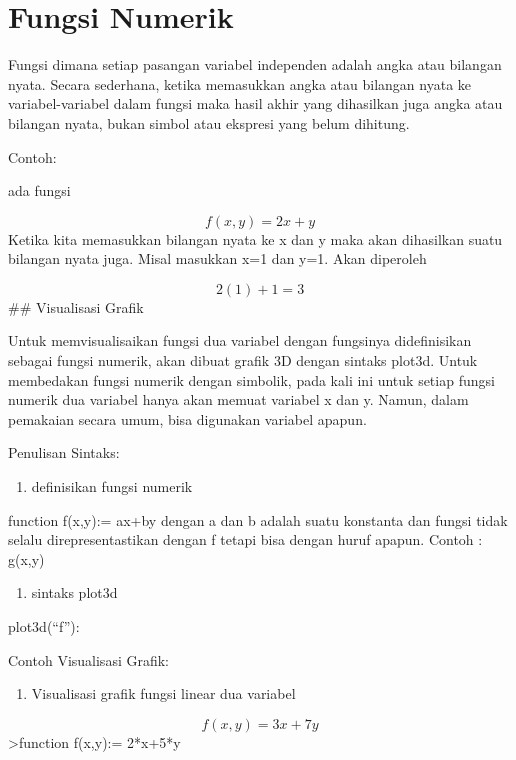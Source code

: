 \documentclass[
]{book}
\providecommand{\tightlist}{%
  \setlength{\itemsep}{0pt}\setlength{\parskip}{0pt}}
\begin{document}
\section{Fungsi Numerik}\label{fungsi-numerik}

Fungsi dimana setiap pasangan variabel independen adalah angka atau bilangan nyata. Secara sederhana, ketika memasukkan angka atau bilangan nyata ke variabel-variabel dalam fungsi maka hasil akhir yang dihasilkan juga angka atau bilangan nyata, bukan simbol atau ekspresi yang belum dihitung.

Contoh:

ada fungsi

\[f(x,y)=2x+y\]Ketika kita memasukkan bilangan nyata ke x dan y maka akan dihasilkan suatu bilangan nyata juga. Misal masukkan x=1 dan y=1. Akan diperoleh

\[2(1)+1=3\]\#\# Visualisasi Grafik

Untuk memvisualisaikan fungsi dua variabel dengan fungsinya didefinisikan sebagai fungsi numerik, akan dibuat grafik 3D dengan sintaks plot3d. Untuk membedakan fungsi numerik dengan simbolik, pada kali ini untuk setiap fungsi numerik dua variabel hanya akan memuat variabel x dan y. Namun, dalam pemakaian secara umum, bisa digunakan variabel apapun.

Penulisan Sintaks:

\begin{enumerate}
\def\labelenumi{\arabic{enumi})}
\tightlist
\item
  definisikan fungsi numerik
\end{enumerate}

function f(x,y):= ax+by dengan a dan b adalah suatu konstanta dan fungsi tidak selalu direpresentastikan dengan f tetapi bisa dengan huruf apapun. Contoh : g(x,y)

\begin{enumerate}
\def\labelenumi{\arabic{enumi})}
\setcounter{enumi}{1}
\tightlist
\item
  sintaks plot3d
\end{enumerate}

plot3d(``f''):

Contoh Visualisasi Grafik:

\begin{enumerate}
\def\labelenumi{\arabic{enumi}.}
\tightlist
\item
  Visualisasi grafik fungsi linear dua variabel
\end{enumerate}

\[f(x,y) = 3x+7y\]\textgreater function f(x,y):= 2*x+5*y
\end{document}
